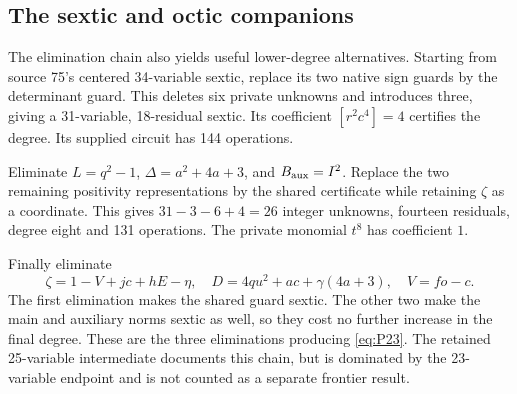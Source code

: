 \subsection{The sextic and octic companions}

The elimination chain also yields useful lower-degree alternatives.
Starting from source 75's centered 34-variable sextic, replace its two
native sign guards by the determinant guard. This deletes six private
unknowns and introduces three, giving a 31-variable, 18-residual sextic.
Its coefficient $[r^2c^4]=4$ certifies the degree. Its supplied circuit
has 144 operations.

Eliminate $L=q^2-1$, $\Delta=a^2+4a+3$, and $B_{\rm aux}=I^2$.
Replace the two remaining positivity representations by the shared
certificate while retaining $\zeta$ as a coordinate. This gives
$31-3-6+4=26$ integer unknowns, fourteen residuals, degree eight and
131 operations. The private monomial $t^8$ has coefficient $1$.

Finally eliminate
\[
 \zeta=1-V+jc+hE-\eta,\quad
 D=4qu^2+ac+\gamma(4a+3),\quad V=fo-c.
\]
The first elimination makes the shared guard sextic. The other two make
the main and auxiliary norms sextic as well, so they cost no further
increase in the final degree. These are the three eliminations producing
\eqref{eq:P23}. The retained 25-variable intermediate documents this
chain, but is dominated by the 23-variable endpoint and is not counted
as a separate frontier result.
